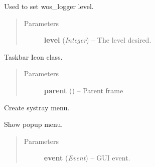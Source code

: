 \documentclass[letterpaper,10pt,english]{sphinxmanual}
\begin{document}

\begin{fulllineitems}
\label{wos:wos.SetLoggerLevel}
Used to set wos\_logger level.
\begin{quote}\begin{description}
\item[{Parameters}] \leavevmode
\textbf{level} (\emph{Integer}) -- The level desired.

\end{description}\end{quote}

\end{fulllineitems}


\begin{fulllineitems}
\label{wos:wos.SysTray}
Taskbar Icon class.
\begin{quote}\begin{description}
\item[{Parameters}] \leavevmode
\textbf{parent} () -- Parent frame

\end{description}\end{quote}

\begin{fulllineitems}
\label{wos:wos.SysTray.CreateMenu}
Create systray menu.

\end{fulllineitems}


\begin{fulllineitems}
\label{wos:wos.SysTray.ShowMenu}
Show popup menu.
\begin{quote}\begin{description}
\item[{Parameters}] \leavevmode
\textbf{event} (\emph{Event}) -- GUI event.

\end{description}\end{quote}

\end{fulllineitems}


\end{fulllineitems}
\end{document}

